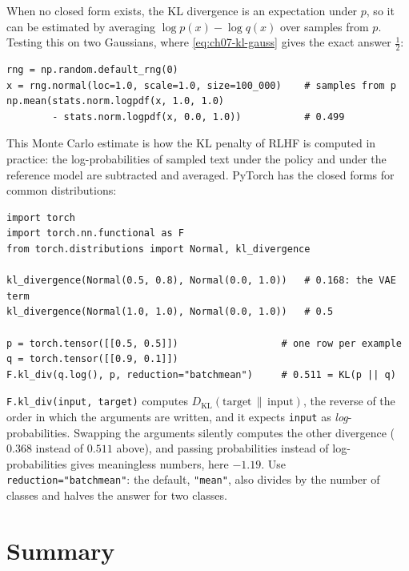 When no closed form exists, the KL divergence is an expectation under
$p$, so it can be estimated by averaging $\log p(x) - \log q(x)$ over
samples from $p$. Testing this on two Gaussians, where
\cref{eq:ch07-kl-gauss} gives the exact answer $\tfrac12$:

\begin{lstlisting}
rng = np.random.default_rng(0)
x = rng.normal(loc=1.0, scale=1.0, size=100_000)    # samples from p
np.mean(stats.norm.logpdf(x, 1.0, 1.0)
        - stats.norm.logpdf(x, 0.0, 1.0))           # 0.499
\end{lstlisting}

This Monte Carlo estimate is how the KL penalty of RLHF is computed in
practice: the log-probabilities of sampled text under the policy and
under the reference model are subtracted and averaged. PyTorch has the
closed forms for common distributions:

\begin{lstlisting}
import torch
import torch.nn.functional as F
from torch.distributions import Normal, kl_divergence

kl_divergence(Normal(0.5, 0.8), Normal(0.0, 1.0))   # 0.168: the VAE term
kl_divergence(Normal(1.0, 1.0), Normal(0.0, 1.0))   # 0.5

p = torch.tensor([[0.5, 0.5]])                  # one row per example
q = torch.tensor([[0.9, 0.1]])
F.kl_div(q.log(), p, reduction="batchmean")     # 0.511 = KL(p || q)
\end{lstlisting}

\begin{warning}
  \texttt{F.kl\_div(input, target)} computes $D_{\mathrm{KL}}(\text{target}
  \,\|\, \text{input})$, the reverse of the order in which the arguments
  are written, and it expects \texttt{input} as \emph{log}-probabilities.
  Swapping the arguments silently computes the other divergence ($0.368$
  instead of $0.511$ above), and passing probabilities instead of
  log-probabilities gives meaningless numbers, here $-1.19$. Use
  \texttt{reduction="batchmean"}: the default, \texttt{"mean"}, also
  divides by the number of classes and halves the answer for two classes.
\end{warning}

\section{Summary}
\label{sec:ch07-summary}

